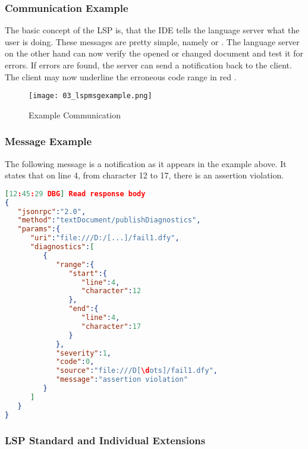 \subsubsection{Communication Example}
The basic concept of the LSP is, that the IDE tells the language server what the user is doing.
These messages are pretty simple, namely  or .
The language server on the other hand can now verify the opened or changed document and test it for errors.
If errors are found, the server can send a  notification back to the client.
The client may now underline the erroneous code range in red \cite{lspspec}.

\begin{figure}[h]
    \centering
    \texttt{[image: 03\_lspmsgexample.png]}
    \caption{Example Communication}
    \label{fig:lspmsgexample}
\end{figure}

\subsubsection{Message Example}
The following message is a  notification as it appears in the example above.
It states that on line 4, from character 12 to 17, there is an assertion violation.\\


\begin{lstlisting}[language=json, caption={LSP Message Example}, captionpos=b, label={lst:lspjsonmsg}]
[12:45:29 DBG] Read response body
{
   "jsonrpc":"2.0",
   "method":"textDocument/publishDiagnostics",
   "params":{
      "uri":"file:///D:/[...]/fail1.dfy",
      "diagnostics":[
         {
            "range":{
               "start":{
                  "line":4,
                  "character":12
               },
               "end":{
                  "line":4,
                  "character":17
               }
            },
            "severity":1,
            "code":0,
            "source":"file:///D[\dots]/fail1.dfy",
            "message":"assertion violation"
         }
      ]
   }
}
\end{lstlisting}

\subsubsection{LSP Standard and Individual Extensions}
\\

